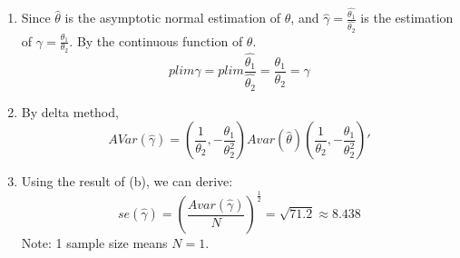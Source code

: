 \documentclass[11pt]{article} %
\begin{document}
\begin{enumerate}
    \item Since $\hat{\theta}$ is the asymptotic normal estimation of $\theta$, and $\hat{\gamma}=\frac{\hat{\theta_1}}{\hat{\theta_2}}$ is the estimation of 
    $\gamma=\frac{\theta_1}{\theta_2}$. By the continuous function of $\theta$. 
    \begin{equation*}
        plim \hat{\gamma}=plim \frac{\hat{\theta_1}}{\hat{\theta_2}}=\frac{\theta_1}{\theta_2}=\gamma
    \end{equation*}
    \item By delta method, 
    \begin{equation*}
        AVar(\hat{\gamma})=(\frac{1}{\theta_2},-\frac{\theta_1}{\theta_2^2})Avar(\hat{\theta})(\frac{1}{\theta_2},-\frac{\theta_1}{\theta_2^2})'
    \end{equation*}
    \item Using the result of (b), we can derive:
    \begin{equation*}
        se(\hat{\gamma})=(\frac{Avar(\hat{\gamma})}{N})^{\frac{1}{2}}=\sqrt{71.2}\approx 8.438
    \end{equation*}
    Note: 1 sample size means $N=1$.
\end{enumerate}
\end{document}
